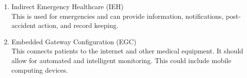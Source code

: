 \documentclass{article}
\begin{document}
\begin{enumerate}
\item Indirect Emergency Healthcare (IEH)
\\ This is used for emergencies and can provide information, notifications, post-accident
action, and record keeping.

\item Embedded Gateway Configuration (EGC)
\\ This connects patients to the internet and other medical equipment. It should allow for
automated and intelligent monitoring. This could include mobile computing devices. 
\end{enumerate}
\end{document}

